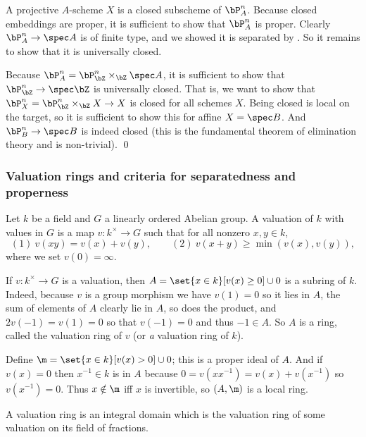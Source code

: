 \ethrm

\bproof

    A projective $A$-scheme $X$ is a closed subscheme of $\bP^n_A$.
    Because closed embeddings are proper, it is sufficient to show that $\bP^n_A$ is proper.
    Clearly $\bP^n_A\to\spec A$ is of finite type, and we showed it is separated by
    .
    So it remains to show that it is universally closed.

    Because $\bP^n_A=\bP^n_\bZ\times_\bZ\spec A$, it is sufficient to show that $\bP^n_\bZ\to\spec\bZ$
    is universally closed.
    That is, we want to show that $\bP^n_X=\bP^n_\bZ\times_\bZ X\to X$ is closed for all schemes $X$.
    Being closed is local on the target, so it is sufficient to show this for affine $X=\spec B$.
    And $\bP^n_B\to\spec B$ is indeed closed (this is the fundamental theorem of elimination theory and is
    non-trivial).
    \qed

\eproof

\subsubsection{Valuation rings and criteria for separatedness and properness}

\bdefn

    Let $k$ be a field and $G$ a linearly ordered Abelian group.
    A {\emphcolor valuation} of $k$ with values in $G$ is a map $v\colon k^\times\to G$ such that for all
    nonzero $x,y\in k$,
    $$ (1)\ v(xy) = v(x) + v(y),\qquad (2)\ v(x+y) \geq \min(v(x),v(y)) , $$
    where we set $v(0)=\infty$.

\edefn

If $v\colon k^\times\to G$ is a valuation, then $A=\set{x\in k}[v(x)\geq0]\cup0$ is a subring of $k$.
Indeed, because $v$ is a group morphism we have $v(1)=0$ so it lies in $A$, the sum of elements of $A$
clearly lie in $A$, so does the product, and $2v(-1)=v(1)=0$ so that $v(-1)=0$ and thus $-1\in A$.
So $A$ is a ring, called the {\emphcolor valuation ring of $v$} (or {\it a\/} valuation ring of $k$).

Define $\m=\set{x\in k}[v(x)>0]\cup0$; this is a proper ideal of $A$.
And if $v(x)=0$ then $x^{-1}\in k$ is in $A$ because $0=v(xx^{-1})=v(x)+v(x^{-1})$ so $v(x^{-1})=0$.
Thus $x\notin\m$ iff $x$ is invertible, so $(A,\m)$ is a local ring.

\bdefn

    A {\emphcolor valuation ring} is an integral domain which is the valuation ring of some valuation on
    its field of fractions.

